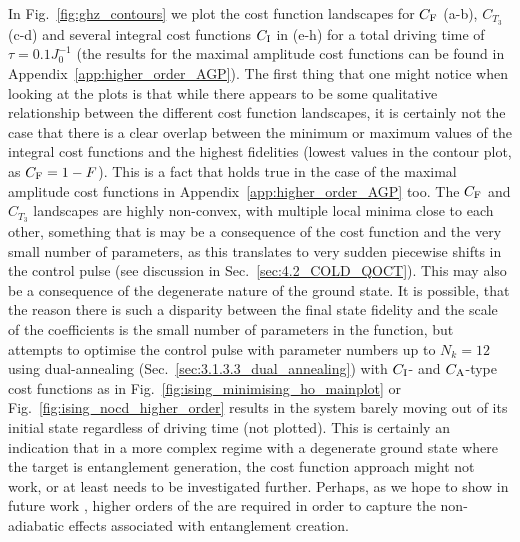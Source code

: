 In Fig.~\ref{fig:ghz_contours} we plot the cost function landscapes for $C_{\rm F}$ (a-b), $C_{T_3}$ (c-d) and several integral cost functions $C_{\rm I}$ in (e-h) for a total driving time of $\tau = 0.1J_0^{-1}$ (the results for the maximal amplitude cost functions can be found in Appendix~\ref{app:higher_order_AGP}). The first thing that one might notice when looking at the plots is that while there appears to be some qualitative relationship between the different cost function landscapes, it is certainly not the case that there is a clear overlap between the minimum or maximum values of the integral cost functions and the highest fidelities (lowest values in the contour plot, as $C_{\rm F} = 1 - F$). This is a fact that holds true in the case of the maximal amplitude cost functions in Appendix~\ref{app:higher_order_AGP} too. The $C_{\rm F}$ and $C_{T_3}$ landscapes are highly non-convex, with multiple local minima close to each other, something that is may be a consequence of the  cost function and the very small number of parameters, as this translates to very sudden piecewise shifts in the control pulse (see discussion in Sec.~\ref{sec:4.2_COLD_QOCT}). This may also be a consequence of the degenerate nature of the ground state. It is possible, that the reason there is such a disparity between the final state fidelity and the scale of the  coefficients is the small number of parameters in the  function, but attempts to optimise the  control pulse with parameter numbers up to $N_k = 12$ using dual-annealing (Sec.~\ref{sec:3.1.3.3_dual_annealing}) with $C_{\rm I}$- and $C_{\rm A}$-type cost functions as in Fig.~\ref{fig:ising_minimising_ho_mainplot} or Fig.~\ref{fig:ising_nocd_higher_order} results in the system barely moving out of its initial state regardless of driving time (not plotted). This is certainly an indication that in a more complex regime with a degenerate ground state where the target is entanglement generation, the  cost function approach might not work, or at least needs to be investigated further. Perhaps, as we hope to show in future work \cite{lawrence_numerical_2023}, higher orders of the  are required in order to capture the non-adiabatic effects associated with entanglement creation.

